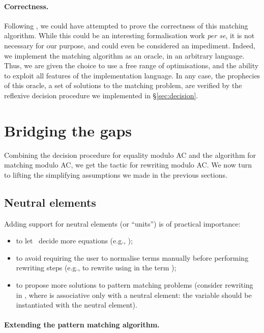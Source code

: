 \documentclass{llncs}
\begin{document}
\paragraph{Correctness.} 

Following \cite{contejean-04}, we could have attempted to prove the
correctness of this matching algorithm. While this could be an
interesting formalisation work \emph{per se}, it is not necessary for
our purpose, and could even be considered an impediment. Indeed, we
implement the matching algorithm as an oracle, in an arbitrary
language.
Thus, we are given the choice to use a free range of optimisations,
and the ability to exploit all features of the implementation language.
In any case, the prophecies of this oracle, a set of solutions to the
matching problem, are verified by the reflexive decision procedure we
implemented in \S\ref{sec:decision}.


\section{Bridging the gaps}
\label{sec:extend}

Combining the decision procedure for equality modulo AC and the
algorithm for matching modulo AC, we get the tactic for rewriting
modulo AC. We now turn to lifting the simplifying assumptions we made
in the previous sections.

\subsection{Neutral elements}
\label{ssec:units}

Adding support for neutral elements (or ``units'') is of practical
importance:
\vspace{-.5em}
\begin{itemize}
\item to let \tac\ decide more equations (e.g.,
  \coqinline);
\item to avoid requiring the user to
  normalise terms manually before performing rewriting steps (e.g., to
  rewrite using  in the term );
\item to propose more solutions to
  pattern matching problems (consider rewriting  in , where
   is associative only with a neutral element: the variable 
  should be instantiated with the neutral element).
\end{itemize}

\paragraph{Extending the pattern matching algorithm.}
\end{document}
